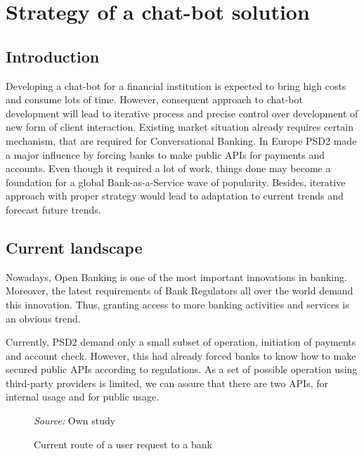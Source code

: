 
\section{Strategy of a chat-bot solution}

\subsection*{Introduction}
Developing a chat-bot for a financial institution is expected to bring high costs and consume lots of time.
However, consequent approach to chat-bot development will lead to iterative process and precise control over development of new form of client interaction.
Existing market situation already requires certain mechanism, that are required for Conversational Banking.
In Europe PSD2 made a major influence by forcing banks to make public APIs for payments and accounts.
Even though it required a lot of work, things done may become a foundation for a global Bank-as-a-Service wave of popularity.
Besides, iterative approach with proper strategy would lead to adaptation to current trends and forecast future trends.

\subsection{Current landscape}

Nowadays, Open Banking is one of the most important innovations in banking.
Moreover, the latest requirements of Bank Regulators all over the world demand this innovation. 
Thus, granting access to more banking activities and services is an obvious trend.

Currently, PSD2 demand only a small subset of operation, initiation of payments and account check.
However, this had already forced banks to know how to make secured public APIs according to regulations.
As a set of possible operation using third-party providers is limited, we can assure that there are two APIs, for internal usage and for public usage.

\begin{figure}
    \centering
    \caption{Current route of a user request to a bank}
    \medskip
    \footnotesize\textit{Source:} Own study
\end{figure}

